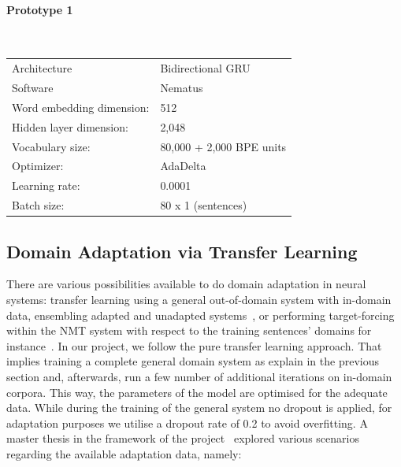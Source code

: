 \documentclass[a4paper,11pt]{article}
\begin{document}
\paragraph{Prototype 1} ~\\

\begin{tabular}{ll}
Architecture & Bidirectional GRU \\
Software & Nematus \\
Word embedding dimension: & 512\\
Hidden layer dimension: & 2,048\\
Vocabulary size: & 80,000 + 2,000 BPE units\\
Optimizer: & AdaDelta\\
Learning rate: & 0.0001\\
Batch size: & 80 x 1 (sentences)\\
\end{tabular}



\subsection{Domain Adaptation via Transfer Learning}
\label{ss:adptNmt}

There are various possibilities available to do domain adaptation in neural systems: transfer learning using a general out-of-domain system with in-domain data, ensembling adapted and unadapted systems~\cite{freitag2016fast}, or performing target-forcing within the NMT system with respect to the training sentences' domains for instance~\cite{Chu2017AnEC}.
In our project, we follow the pure transfer learning approach. That implies training a complete general domain system as explain in the previous section and, afterwards, run a few number of additional iterations on in-domain corpora. This way, the parameters of the model are optimised for the adequate data. While during the training of the general system no dropout is applied, for adaptation purposes we utilise a dropout rate of 0.2 to avoid overfitting. 
A master thesis in the framework of the project~\cite{tesisAdam} explored various scenarios regarding the available adaptation data, namely: 
\end{document}
